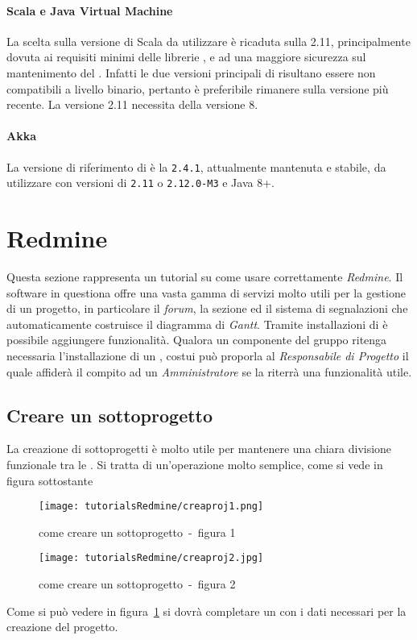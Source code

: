 \documentclass{scalatekids-article}
\begin{document}
\paragraph{Scala e Java Virtual Machine}

La scelta sulla versione di Scala da utilizzare è ricaduta sulla 
2.11, principalmente dovuta ai requisiti minimi delle librerie \textit{}, e
ad una maggiore sicurezza sul mantenimento del . Infatti le due versioni
principali di  risultano essere non compatibili a livello binario,
pertanto è preferibile rimanere sulla versione più recente. La versione 2.11
necessita della  versione 8.

\paragraph{Akka}

La versione di riferimento di  è la \verb=2.4.1=, attualmente
mantenuta e stabile, da utilizzare con versioni di  \verb=2.11= o
\verb=2.12.0-M3= e Java 8+.

\newpage
\appendix

\section{Redmine}

\label{sec:redmine}
Questa sezione rappresenta un tutorial su come usare correttamente \textit{Redmine}. Il software in questiona offre una vasta gamma di servizi molto utili per la gestione di un progetto, in particolare il \textit{forum}, la sezione  ed il sistema di segnalazioni che automaticamente costruisce il diagramma di \textit{Gantt}. Tramite installazioni di  è possibile aggiungere funzionalità. Qualora un componente del gruppo ritenga necessaria l'installazione di un , costui può proporla al \textit{Responsabile di Progetto} il quale affiderà il compito ad un \textit{Amministratore} se la riterrà una funzionalità utile.

\subsection{Creare un sottoprogetto}

La creazione di sottoprogetti è molto utile per mantenere una chiara divisione funzionale tra le . Si tratta di un'operazione molto semplice, come si vede in figura sottostante
\begin{figure}[H]
    \centering
    \texttt{[image: tutorialsRedmine/creaproj1.png]}
    \caption{come creare un sottoprogetto\ -\ figura 1}
\end{figure}
\begin{figure}[H]
    \centering
    \texttt{[image: tutorialsRedmine/creaproj2.jpg]}
    \caption{come creare un sottoprogetto\ -\ figura 2\label{fig:figura-2}}
\end{figure}
Come si può vedere in figura~\ref{fig:figura-2} si dovrà completare un  con i dati necessari per la creazione del progetto.
\end{document}
